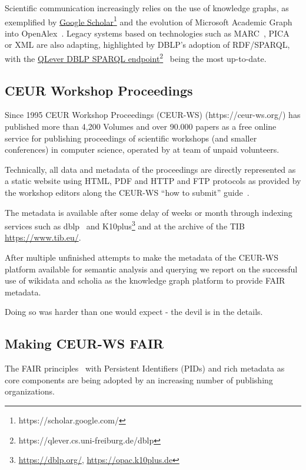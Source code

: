 \documentclass[runningheads]{llncs}
\newcommand{\footnotelink}[2]{\href{#1}{#2}\footnote{#1}}
\begin{document}
Scientific communication increasingly relies on the use of knowledge graphs, as exemplified by \footnotelink{https://scholar.google.com/}{Google Scholar} and the evolution of Microsoft Academic Graph~\cite{Wang2020} into OpenAlex~\cite{Priem2022}. Legacy systems based on technologies such as MARC~\cite{Ganseman2015}, PICA~\cite{Costers1997}  or XML are also adapting, highlighted by DBLP's adoption of RDF/SPARQL, with the  \footnotelink{https://qlever.cs.uni-freiburg.de/dblp}{QLever DBLP SPARQL endpoint}~\cite{Bast2017} being the most up-to-date.

\subsection{CEUR Workshop Proceedings}
Since 1995 CEUR Workshop Proceedings (CEUR-WS) (https://ceur-ws.org/) has published more than 4,200 Volumes and over 90.000 papers as a free online service for publishing proceedings of scientific workshops (and smaller conferences) in computer science, operated by at team of unpaid volunteers.

Technically, all data and metadata of the proceedings are directly represented as a static website using HTML, PDF and HTTP and FTP protocols as provided by the workshop editors along the CEUR-WS “how to submit” guide~\cite{CEURHowtoSubmit}.

The metadata is available after some delay of weeks or month through indexing services such as dblp~\cite{Ley2009} and {K10plus}\cite{k10plus2019}\footnote{\url{https://dblp.org/}, \url{https://opac.k10plus.de}} and at the archive of the TIB \url{https://www.tib.eu/}.

After multiple unfinished attempts to make the metadata of the CEUR-WS platform available for semantic analysis and querying we report on the successful use of wikidata and scholia as the knowledge graph platform to provide FAIR metadata.

Doing so was harder than one would expect - the devil is in the details.

\subsection{Making CEUR-WS FAIR}\label{sec:FAIR}
The FAIR principles~\cite{GOFAIR2019,Wilkinson2016} with Persistent Identifiers (PIDs) and rich metadata as core components are being adopted by an increasing number of publishing organizations.
\end{document}
